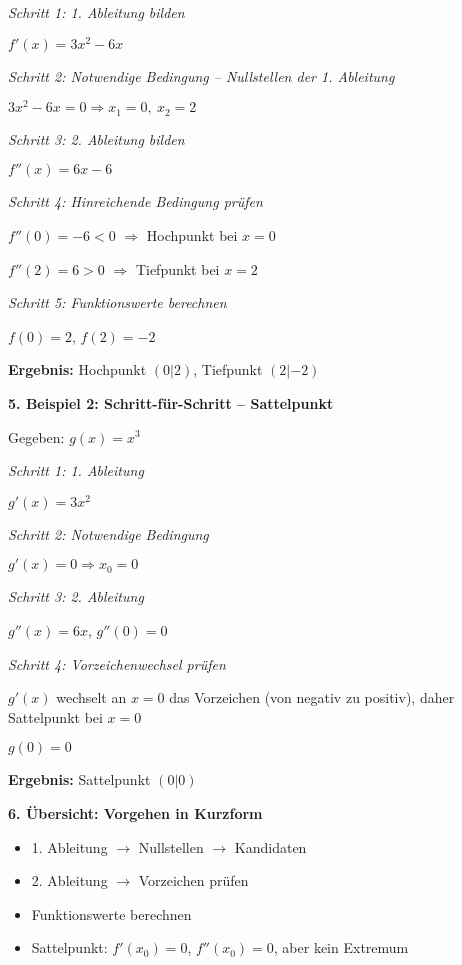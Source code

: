 \textit{Schritt 1: 1. Ableitung bilden}

$f'(x) = 3x^2 - 6x$

\textit{Schritt 2: Notwendige Bedingung – Nullstellen der 1. Ableitung}

$3x^2 - 6x = 0 \Rightarrow x_1 = 0,\ x_2 = 2$

\textit{Schritt 3: 2. Ableitung bilden}

$f''(x) = 6x - 6$

\textit{Schritt 4: Hinreichende Bedingung prüfen}

$f''(0) = -6 < 0$ $\Rightarrow$ Hochpunkt bei $x=0$

$f''(2) = 6 > 0$ $\Rightarrow$ Tiefpunkt bei $x=2$

\textit{Schritt 5: Funktionswerte berechnen}

$f(0) = 2$, $f(2) = -2$

\textbf{Ergebnis:} Hochpunkt $(0|2)$, Tiefpunkt $(2|-2)$

\vspace{0.5em}

\textbf{5. Beispiel 2: Schritt-für-Schritt – Sattelpunkt}

Gegeben: $g(x) = x^3$

\textit{Schritt 1: 1. Ableitung}

$g'(x) = 3x^2$

\textit{Schritt 2: Notwendige Bedingung}

$g'(x) = 0 \Rightarrow x_0 = 0$

\textit{Schritt 3: 2. Ableitung}

$g''(x) = 6x$, $g''(0) = 0$

\textit{Schritt 4: Vorzeichenwechsel prüfen}

$g'(x)$ wechselt an $x=0$ das Vorzeichen (von negativ zu positiv), daher Sattelpunkt bei $x=0$

$g(0) = 0$

\textbf{Ergebnis:} Sattelpunkt $(0|0)$

\vspace{0.5em}

\textbf{6. Übersicht: Vorgehen in Kurzform}

\begin{itemize}
    \item 1. Ableitung $\rightarrow$ Nullstellen $\rightarrow$ Kandidaten
    \item 2. Ableitung $\rightarrow$ Vorzeichen prüfen
    \item Funktionswerte berechnen
    \item Sattelpunkt: $f'(x_0)=0$, $f''(x_0)=0$, aber kein Extremum
\end{itemize}

